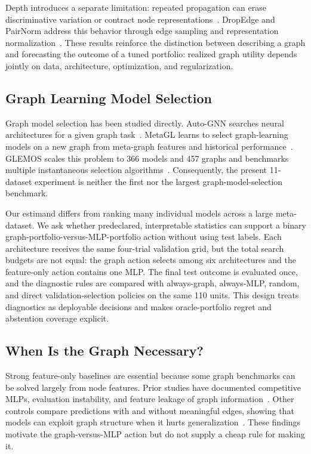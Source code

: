 Depth introduces a separate limitation: repeated propagation can erase discriminative variation or contract node representations~\cite{oono2020exponential,chen2020measuring}. DropEdge and PairNorm address this behavior through edge sampling and representation normalization~\cite{rong2020dropedge,zhao2020pairnorm}. These results reinforce the distinction between describing a graph and forecasting the outcome of a tuned portfolio: realized graph utility depends jointly on data, architecture, optimization, and regularization.

\subsection{Graph Learning Model Selection}

Graph model selection has been studied directly. Auto-GNN searches neural architectures for a given graph task~\cite{zhou2020autognn}. MetaGL learns to select graph-learning models on a new graph from meta-graph features and historical performance~\cite{park2023metagl}. GLEMOS scales this problem to 366 models and 457 graphs and benchmarks multiple instantaneous selection algorithms~\cite{park2023glemos}. Consequently, the present 11-dataset experiment is neither the first nor the largest graph-model-selection benchmark.

Our estimand differs from ranking many individual models across a large meta-dataset. We ask whether predeclared, interpretable statistics can support a binary graph-portfolio-versus-MLP-portfolio action without using test labels. Each architecture receives the same four-trial validation grid, but the total search budgets are not equal: the graph action selects among six architectures and the feature-only action contains one MLP. The final test outcome is evaluated once, and the diagnostic rules are compared with always-graph, always-MLP, random, and direct validation-selection policies on the same 110 units. This design treats diagnostics as deployable decisions and makes oracle-portfolio regret and abstention coverage explicit.

\subsection{When Is the Graph Necessary?}

Strong feature-only baselines are essential because some graph benchmarks can be solved largely from node features. Prior studies have documented competitive MLPs, evaluation instability, and feature leakage of graph information~\cite{shchur2018pitfalls,katsman2026necessary}. Other controls compare predictions with and without meaningful edges, showing that models can exploit graph structure when it hurts generalization~\cite{bechler2024graphs}. These findings motivate the graph-versus-MLP action but do not supply a cheap rule for making it.

